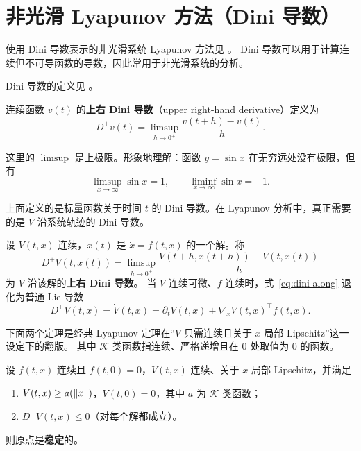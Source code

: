 \section{非光滑 Lyapunov 方法（Dini 导数）}\label{sec:dini}

使用 Dini 导数表示的非光滑系统 Lyapunov 方法见 \cite{roucheStabilityTheoryLiapunov1977}。
Dini 导数可以用于计算连续但不可导函数的导数，因此常用于非光滑系统的分析。

Dini 导数的定义见 \cite[p.~659, Theorem 3.4 的证明]{khalilNonlinearSystems}。

\begin{definition}[Dini 导数]
  连续函数 $v(t)$ 的\textbf{上右 Dini 导数}（upper right-hand derivative）定义为
  \begin{equation}
    D^+ v(t)=\limsup_{h\to0^+}\frac{v(t+h)-v(t)}{h}.
  \end{equation}
\end{definition}

这里的 $\limsup$ 是上极限。形象地理解：函数 $y=\sin x$ 在无穷远处没有极限，但有
\[
  \limsup_{x\to\infty}\sin x=1,\qquad \liminf_{x\to\infty}\sin x=-1 .
\]

上面定义的是标量函数关于时间 $t$ 的 Dini 导数。在 Lyapunov 分析中，真正需要的是 $V$ 沿系统轨迹的 Dini 导数。

\begin{definition}\label{def:dini-along-trajectory}
  设 $V(t,x)$ 连续，$x(t)$ 是 $\dot x=f(t,x)$ 的一个解。称
  \begin{equation}\label{eq:dini-along}
    D^+V(t,x(t))=\limsup_{h\to0^+}\frac{V(t+h,x(t+h))-V(t,x(t))}{h}
  \end{equation}
  为 $V$ 沿该解的\textbf{上右 Dini 导数}。
  当 $V$ 连续可微、$f$ 连续时，式~\eqref{eq:dini-along} 退化为普通 Lie 导数
  \[
    D^+V(t,x)=\dot V(t,x)=\partial_t V(t,x)+\nabla_x V(t,x)^\top f(t,x).
  \]
\end{definition}

下面两个定理是经典 Lyapunov 定理在“$V$ 只需连续且关于 $x$ 局部 Lipschitz”这一设定下的翻版。
其中 $\mathcal K$ 类函数指连续、严格递增且在 $0$ 处取值为 $0$ 的函数。

\begin{theorem}\label{thm:dini-lyapunov}
  设 $f(t,x)$ 连续且 $f(t,0)=0$，$V(t,x)$ 连续、关于 $x$ 局部 Lipschitz，并满足
  \begin{enumerate}
    \item $V(t,x)\ge a(\left\lVert x\right\rVert)$，$V(t,0)=0$，其中 $a$ 为 $\mathcal K$ 类函数；
    \item $D^+V(t,x)\le0$（对每个解都成立）。
  \end{enumerate}
  则原点是\textbf{稳定}的。
  \cite[Theorem II.6.2]{roucheStabilityTheoryLiapunov1977}
\end{theorem}

